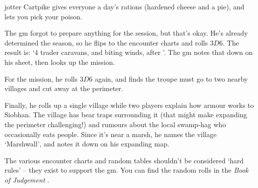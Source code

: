 \begin{multicols}{2}
{\begin{description}
    \Gls{jotter} Cartpike gives everyone a day's rations (hardened cheese and a pie), and lets you pick your poison.
  \end{description}

}{
  The \gls{gm} forgot to prepare anything for the session, but that's okay.
  He's already determined the season, so he flips to the encounter charts and rolls $3D6$.
  The result is: `4 trader caravans, and biting winds, after '.
  The \gls{gm} notes that down on his sheet, then looks up the mission.

  For the mission, he rolls $3D6$ again, and finds the troupe must go to two nearby \glspl{village} and cut away at the perimeter.

  Finally, he rolls up a single \gls{village} while two players explain how armour works to Siobhan.
  The \gls{village} has bear traps surrounding it (that might make expanding the perimeter challenging!) and rumours about the local swamp-hag who occasionally eats people.
  Since it's near a marsh, he names the \gls{village} `Marshwall', and notes it down on his expanding map.

  The various encounter charts and random tables shouldn't be considered `hard rules' -- they exist to support the \gls{gm}.
  You can find the random rolls in the \textit{Book of Judgement}%
  \iftoggle{judgement}{, \autoref{encounters}, \autopageref{encounters}}{}.
}



\end{multicols}
